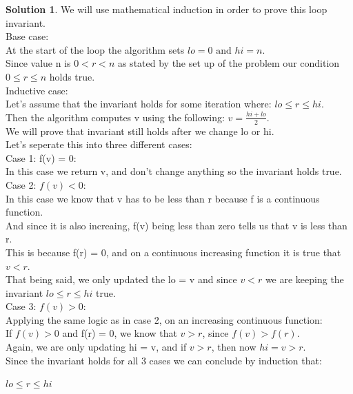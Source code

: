 \documentclass[10pt,letterpaper,unboxed,cm]{article}
\theoremstyle{definition}
\newtheorem*{solution}{Solution}
\begin{document}
\begin{enumerate}
\begin{enumerate}
\begin{solution}
    We will use mathematical induction in order to prove this loop invariant.\\
    Base case:\\
    At the start of the loop the algorithm sets \(lo = 0 \text{ and } hi = n\).\\
    Since value n is $0 < r < n$ as stated by the set up of the problem our condition $0 \leq r \leq n$ holds true.\\
    Inductive case:\\
    Let's assume that the invariant holds for some iteration where: \(lo \leq r \leq hi\).\\
    Then the algorithm computes v using the following: \(v = \frac{hi + lo}{2}\).\\
    We will prove that invariant still holds after we change lo or hi.\\
    Let's seperate this into three different cases:\\
    Case 1: f(v) = 0:\\
    In this case we return v, and don't change anything so the invariant holds true.\\
    Case 2: $f(v) < 0$:\\
    In this case we know that v has to be less than r because f is a continuous function.\\
    And since it is also increaing, f(v) being less than zero tells us that v is less than r.\\
    This is because f(r) = 0, and on a continuous increasing function it is true that $v < r$.\\
    That being said, we only updated the lo = v and since $v < r$ we are keeping the invariant $lo \leq r \leq hi$ true.\\
    Case 3: $f(v) > 0$:\\
    Applying the same logic as in case 2, on an increasing continuous function:\\
    If $f(v) > 0$ and f(r) = 0, we know that $v > r$, since $f(v) > f(r)$.\\
    Again, we are only updating hi = v, and if $v > r$, then now $hi = v > r$.\\
    Since the invariant holds for all 3 cases we can conclude by induction that:\\
    \begin{center}
        $\boxed{lo \leq r \leq hi}$
    \end{center}
\end{solution}


\end{enumerate}
\end{enumerate}
\end{document}

